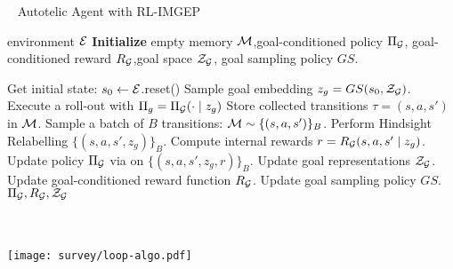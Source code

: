 \noindent\begin{minipage}{\textwidth}
   \centering
   \begin{minipage}{.6\textwidth}
        \begin{algorithm}[H]
            \small
        	\caption{~ Autotelic Agent with RL-IMGEP}
        	\label{algo:IMGEP}
        	\begin{algorithmic}[1]
            	\REQUIRE environment $\mathcal{E}$
            	\STATE \textbf{Initialize} empty memory $\mathcal{M}$,goal-conditioned policy $\Pi_{\mathcal{G}}$, goal-conditioned reward $R_{\mathcal{G}}$,goal space $\mathcal{Z}_{\mathcal{G}}$, goal sampling policy $GS$.
            	
            	\LOOP
            	
                \STATE Get initial state: $s_0 \leftarrow \mathcal{E}$.reset()
            	\STATE Sample goal embedding $z_g=GS(s_0, \mathcal{Z}_{\mathcal{G}})$.
            	\STATE Execute a roll-out with $\Pi_g=\Pi_{\mathcal{G}}(\cdot \mid z_g)$
            	\STATE Store collected transitions $\tau=(s,a,s')$ in $\mathcal{M}$.
                \STATE Sample a batch of $B$ transitions: $\mathcal{M}\sim \{(s,a,s')\}_B$.
                \STATE Perform Hindsight Relabelling $\{(s,a,s',z_g)\}_B$.
                \STATE Compute internal rewards $r=R_{\mathcal{G}}(s,a,s'\mid z_g)$.
            	\STATE Update policy $\Pi_{\mathcal{G}}$ via \rl on $\{(s,a,s',z_g,r)\}_B$.
            	\STATE Update goal representations  $\mathcal{Z}_{\mathcal{G}}$. 
            	\STATE Update goal-conditioned reward function $R_{\mathcal{G}}$. 
            	\STATE Update goal sampling policy $GS$.
            	\ENDLOOP
            	\STATE \Return $\Pi_{\mathcal{G}}, R_{\mathcal{G}}, \mathcal{Z}_{\mathcal{G}}$
        	\end{algorithmic}
        \end{algorithm}
   \end{minipage}
   \hspace{0.2cm}
   \begin{minipage}{.37\textwidth}
  \textbf{ } \\
  \\
        \centering
        \texttt{[image: survey/loop-algo.pdf]}
    \end{minipage}
   \label{fig:test}
\end{minipage}
    
